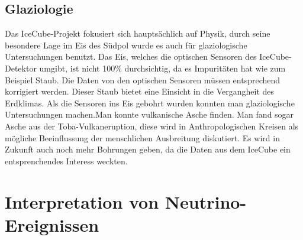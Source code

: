 \subsection{Glaziologie}

Das IceCube-Projekt fokusiert sich hauptsächlich auf Physik, durch seine besondere Lage im Eis des Südpol wurde es
auch für glaziologische Untersuchungen benutzt.
Das Eis, welches die optischen Sensoren des IceCube-Detektor umgibt, ist nicht 100\% durchsichtig, da es Impuritäten hat
wie zum Beispiel Staub. Die Daten von den optischen Sensoren müssen entsprechend korrigiert werden. Dieser Staub bietet
eine Einsicht in die Vergangheit des Erdklimas. Als die Sensoren ins Eis gebohrt wurden konnten man glaziologische
Untersuchungen machen.Man konnte vulkanische Asche finden. Man fand sogar Asche aus der Toba-Vulkaneruption, diese wird
in Anthropologischen Kreisen als mögliche Beeinflussung der menschlichen Ausbreitung diskutiert. Es wird in Zukunft auch
noch mehr Bohrungen geben, da die Daten aus dem IceCube ein entsprenchendes Interess weckten. \cite{IceCube2013}

\section{Interpretation von Neutrino-Ereignissen}

